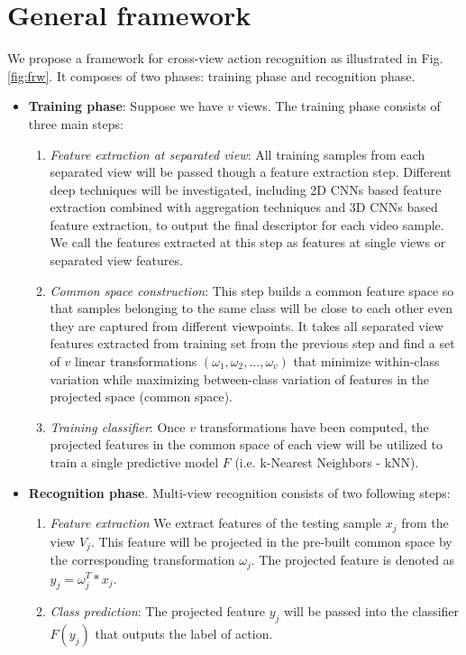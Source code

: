 
\section{General framework}
    We propose a framework for cross-view action recognition as illustrated in Fig.\ref{fig:frw}. It composes of two phases: training phase and recognition phase. 
    \begin{itemize}
        \item \textbf{Training phase}: Suppose we have $v$ views. The training phase consists of three main steps: 
        \begin{enumerate}
            \item \textit{Feature extraction at separated view}: All training samples from each separated view will be passed though a feature extraction step. Different deep techniques will be investigated, including 2D CNNs based feature extraction combined with aggregation techniques and 3D CNNs based feature extraction, to output the final descriptor for each video sample. We call the features extracted at this step as features at single views or separated view features. 
            \item \textit{Common space construction}: This step builds a common feature space so that samples belonging to the same class will be close to each other even they are captured from different viewpoints. It takes all separated view features extracted from training set from the previous step and find a set of $v$ linear transformations $({\omega}_1, {\omega}_2, ..., {\omega}_v)$ that minimize within-class variation while maximizing between-class variation of features in the projected space (common space). 
            \item \textit{Training classifier}: Once $v$ transformations have been computed, the projected features in the common space of each view will be utilized to train a single predictive model $F$ (i.e. k-Nearest Neighbors - kNN). %
        \end{enumerate}
        \item \textbf{Recognition phase}. Multi-view recognition consists of two following steps:
        \begin{enumerate}
            \item \textit{Feature extraction} We extract features of the testing sample $x_j$ from the view $V_j$. This feature will be projected in the pre-built common space by the corresponding transformation ${\omega}_j$. The projected feature is denoted as $y_j = {\omega}^T_j*x_j$.
            \item \textit{Class prediction}: The projected feature $y_j$ will be passed into the classifier $F(y_j)$ that outputs the label of action.
        \end{enumerate}
    \end{itemize}

